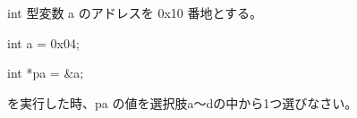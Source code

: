 int 型変数 a のアドレスを 0x10 番地とする。\par
\noindent int a = 0x04; \par
\noindent int *pa = \&a; \par
を実行した時、pa の値を選択肢a〜dの中から1つ選びなさい。
